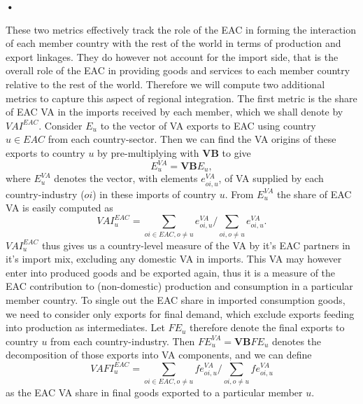 \textbf{\textbf{•}}\documentclass[a4paper]{article}
\begin{document}
These two metrics effectively track the role of the EAC in forming the interaction of each member country with the rest of the world in terms of production and export linkages. They do however not account for the import side, that is the overall role of the EAC in providing goods and services to each member country relative to the rest of the world. Therefore we will compute two additional metrics to capture this aspect of regional integration. The first metric is the share of EAC VA in the imports received by each member, which we shall denote by $VAI^{EAC}$. Consider $E_u$ to the vector of VA exports to EAC using country $u \in EAC$ from each country-sector.%
Then we can find the VA origins of these exports to country $u$ by pre-multiplying with \textbf{VB} to give 
\begin{equation}
E_u^{VA} = \textbf{VB}E_u,
\end{equation}
 where $E_u^{VA}$ denotes the vector, with elements $e_{oi, u}^{VA}$, of VA supplied by each country-industry ($oi$) in these imports of country $u$. From  $E_u^{VA}$ the share of EAC VA is easily computed as 
\begin{equation}
VAI_{u}^{EAC} = \sum_{oi \in EAC, o \neq u}  e_{oi, u}^{VA}  \bigg/ \sum_{oi, o \neq u}  e_{oi, u}^{VA}.  
\end{equation}
$VAI_u^{EAC}$ thus gives us a country-level measure of the VA by it's EAC partners in it's import mix, excluding any domestic VA in imports. This VA may however enter into produced goods and be exported again, thus it is a measure of the EAC contribution to (non-domestic) production and consumption in a particular member country. To single out the EAC share in imported consumption goods, we need to consider only exports for final demand, which exclude exports feeding into production as intermediates. Let $FE_u$ therefore denote the final exports to country $u$ from each country-industry. Then $FE_u^{VA} = \textbf{VB}FE_u$ denotes the decomposition of those exports into VA components, and we can define 
\begin{equation}
VAFI_{u}^{EAC} = \sum_{oi \in EAC, o \neq u}  fe_{oi, u}^{VA}  \bigg/ \sum_{oi, o \neq u}  fe_{oi, u}^{VA}
\end{equation}
as the EAC VA share in final goods exported to a particular member $u$.
\end{document}
